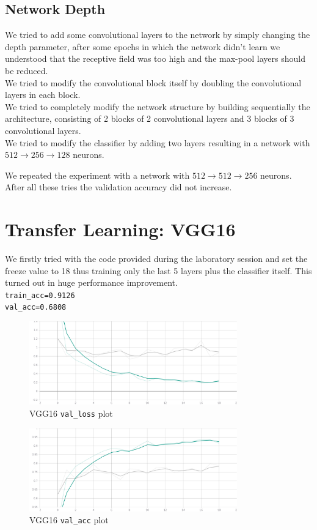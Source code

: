 \documentclass{article}
\begin{document}
	\subsection{Network Depth}
	We tried to add some convolutional layers to the network by simply changing the depth parameter, after some epochs in which the network didn't learn we understood that the receptive field was too high and the max-pool layers should be reduced. \\
	We tried to modify the convolutional block itself by doubling the convolutional layers in each block.\\
	We tried to completely modify the network structure by building sequentially the architecture, consisting of 2 blocks of 2 convolutional layers  and 3 blocks of 3 convolutional layers. \\
	We tried to modify the classifier by adding two layers resulting in a network with \(512 \rightarrow 256 \rightarrow 128\) neurons.

	\newpage
	
	
	We repeated the experiment with a network with \(512 \rightarrow 512 \rightarrow 256\) neurons.\\
	After all these tries the validation accuracy did not increase.
	
	\section{Transfer Learning: VGG16}
		We firstly tried with the code provided during the laboratory session and set the freeze value to 18 thus training only the last 5 layers plus the classifier itself. This turned out in huge performance improvement. \\
		\texttt{train\_acc=0.9126} \\
		\texttt{val\_acc=0.6808}
		
		\begin{figure}[H]
			\centering
			\includegraphics[width=9cm, keepaspectratio]{VGG_LOSS.jpg}
			\caption{VGG16 \texttt{val\_loss} plot}
		\end{figure}
	
		\begin{figure}[H]
			\centering
			\includegraphics[width=9cm, keepaspectratio]{VGG_ACC.jpg}
			\caption{VGG16 \texttt{val\_acc} plot}
		\end{figure}
		
\end{document}
